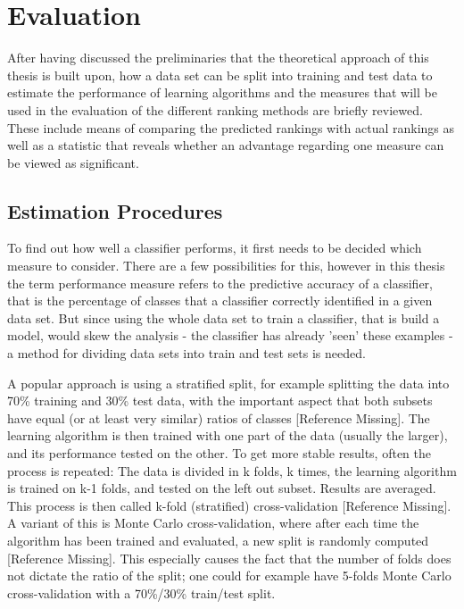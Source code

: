 \section{Evaluation}

After having discussed the preliminaries that the theoretical approach of this thesis is built upon, how a data set can be split into training and test data to estimate the performance of learning algorithms and the measures that will be used in the evaluation of the different ranking methods are briefly reviewed. These include means of comparing the predicted rankings with actual rankings as well as a statistic that reveals whether an advantage regarding one measure can be viewed as significant.

\subsection{Estimation Procedures}

To find out how well a classifier performs, it first needs to be decided which measure to consider. There are a few possibilities for this, however in this thesis the term performance measure refers to the predictive accuracy of a classifier, that is the percentage of classes that a classifier correctly identified in a given data set. But since using the whole data set to train a classifier, that is build a model, would skew the analysis - the classifier has already 'seen' these examples - a method for dividing data sets into train and test sets is needed. 

A popular approach is using a stratified split, for example splitting the data into 70\% training and 30\% test data, with the important aspect that both subsets have equal (or at least very similar) ratios of classes [Reference Missing]. The learning algorithm is then trained with one part of the data (usually the larger), and its performance tested on the other. To get more stable results, often the process is repeated: The data is divided in k folds, k times, the learning algorithm is trained on k-1 folds, and tested on the left out subset. Results are averaged. This process is then called k-fold (stratified) cross-validation [Reference Missing]. A variant of this is Monte Carlo cross-validation, where after each time the algorithm has been trained and evaluated, a new split is randomly computed [Reference Missing]. This especially causes the fact that the number of folds does not dictate the ratio of the split; one could for example have 5-folds Monte Carlo cross-validation with a 70\%/30\% train/test split.

